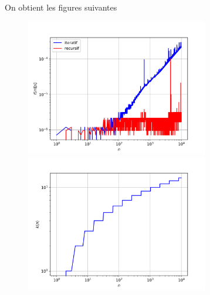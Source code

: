 \documentclass[a4paper,12pt]{article}
\begin{document}
On obtient les figures suivantes
\begin{figure}[htbp]
\includegraphics[width=8cm]{./2024/exo2-time.png}
\includegraphics[width=8cm]{./2024/exo2-appel-recursif.png}
\end{figure}


\clearpage
\end{document}

